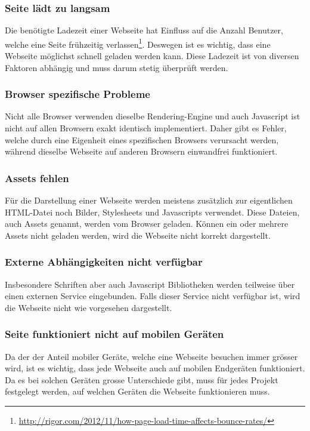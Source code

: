 \subsubsection{Seite lädt zu langsam}
\label{ssub:seite_lädt_zu_langsam}
Die benötigte Ladezeit einer Webseite hat Einfluss auf die Anzahl Benutzer, welche eine Seite frühzeitig verlassen\footnote{\url{http://rigor.com/2012/11/how-page-load-time-affects-bounce-rates/}}. Deswegen ist es wichtig, dass eine Webseite möglichst schnell geladen werden kann. Diese Ladezeit ist von diversen Faktoren abhängig und muss darum stetig überprüft werden.

\subsubsection{Browser spezifische Probleme}
\label{ssub:browserspezifischeprobleme}
Nicht alle Browser verwenden dieselbe Rendering-Engine und auch Javascript ist nicht auf allen Browsern exakt identisch implementiert. Daher gibt es Fehler, welche durch eine Eigenheit eines spezifischen Browsers verursacht werden, während dieselbe Webseite auf anderen Browsern einwandfrei funktioniert.

\subsubsection{Assets fehlen}
\label{ssub:assetsfehlen}
Für die Darstellung einer Webseite werden meistens zusätzlich zur eigentlichen HTML-Datei noch Bilder, Stylesheets und Javascripts verwendet. Diese Dateien, auch Assets genannt, werden vom Browser geladen. Können ein oder mehrere Assets nicht geladen werden, wird die Webseite nicht korrekt dargestellt.

\subsubsection{Externe Abhängigkeiten nicht verfügbar}
\label{ssub:externeabhaengigkeiten_nicht_verfügbar}
Insbesondere Schriften aber auch Javascript Bibliotheken werden teilweise über einen externen Service eingebunden. Falls dieser Service nicht verfügbar ist, wird die Webseite nicht wie vorgesehen dargestellt.

\subsubsection{Seite funktioniert nicht auf mobilen Geräten}
\label{ssub:seitefunktioniertnichtaufmobilengeraeten}
Da der der Anteil mobiler Geräte, welche eine Webseite besuchen immer grösser wird, ist es wichtig, dass jede Webseite auch auf mobilen Endgeräten funktioniert. Da es bei solchen Geräten grosse Unterschiede gibt, muss für jedes Projekt festgelegt werden, auf welchen Geräten die Webseite funktionieren muss.


